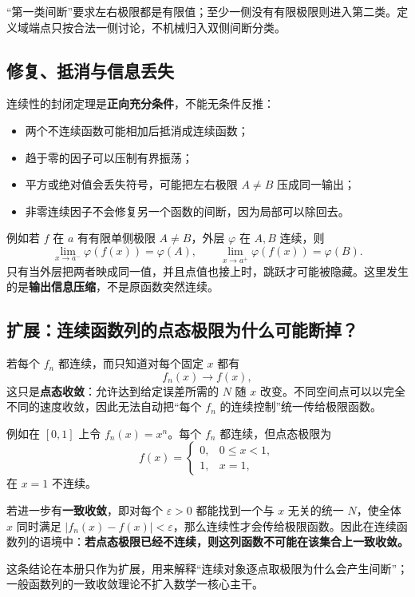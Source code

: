 \documentclass[11pt,a4paper]{ctexart}
\newcommand{\kw}[1]{\textbf{\color{deep}#1}}
\begin{document}
“第一类间断”要求左右极限都是有限值；至少一侧没有有限极限则进入第二类。定义域端点只按合法一侧讨论，不机械归入双侧间断分类。

\subsection{修复、抵消与信息丢失}

连续性的封闭定理是\kw{正向充分条件}，不能无条件反推：
\begin{itemize}
  \item 两个不连续函数可能相加后抵消成连续函数；
  \item 趋于零的因子可以压制有界振荡；
  \item 平方或绝对值会丢失符号，可能把左右极限 $A\ne B$ 压成同一输出；
  \item 非零连续因子不会修复另一个函数的间断，因为局部可以除回去。
\end{itemize}

例如若 $f$ 在 $a$ 有有限单侧极限 $A\ne B$，外层 $\varphi$ 在 $A,B$ 连续，则
\[
\lim_{x\to a^-}\varphi(f(x))=\varphi(A),\qquad
\lim_{x\to a^+}\varphi(f(x))=\varphi(B).
\]
只有当外层把两者映成同一值，并且点值也接上时，跳跃才可能被隐藏。这里发生的是\kw{输出信息压缩}，不是原函数突然连续。

\subsection{扩展：连续函数列的点态极限为什么可能断掉？}

若每个 $f_n$ 都连续，而只知道对每个固定 $x$ 都有
\[
f_n(x)\to f(x),
\]
这只是\kw{点态收敛}：允许达到给定误差所需的 $N$ 随 $x$ 改变。不同空间点可以以完全不同的速度收敛，因此无法自动把“每个 $f_n$ 的连续控制”统一传给极限函数。

例如在 $[0,1]$ 上令 $f_n(x)=x^n$。每个 $f_n$ 都连续，但点态极限为
\[
f(x)=\begin{cases}
0,&0\le x<1,\\
1,&x=1,
\end{cases}
\]
在 $x=1$ 不连续。

若进一步有\kw{一致收敛}，即对每个 $\varepsilon>0$ 都能找到一个与 $x$ 无关的统一 $N$，使全体 $x$ 同时满足 $\lvert f_n(x)-f(x)\rvert<\varepsilon$，那么连续性才会传给极限函数。因此在连续函数列的语境中：\textbf{若点态极限已经不连续，则这列函数不可能在该集合上一致收敛。}

这条结论在本册只作为扩展，用来解释“连续对象逐点取极限为什么会产生间断”；一般函数列的一致收敛理论不扩入数学一核心主干。
\end{document}
